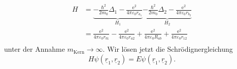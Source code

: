 \begin{equation}
	\label{3.23}
	\begin{split}
		H &= \underbrace{- \frac{\hbar ^2}{2 m_0} \Delta_1 - \frac{\mathrm{e}^2}{4 \pi \varepsilon_0 r_{a_1}}}_{H_1}  \underbrace{- \frac{\hbar ^2}{2 m_0} \Delta_2 - \frac{\mathrm{e}^2}{4 \pi \varepsilon_0 r_{b_2}}}_{H_2}\\
	  &= \frac{\mathrm{e}^2}{4 \pi \varepsilon_0 r_{b1}} - \frac{\mathrm{e}^2}{4 \pi \varepsilon_0 r_{a 2}} + \frac{\mathrm{e}^2}{4 \pi \varepsilon_0 R_{ab}}+ \frac{\mathrm{e}^2}{4 \pi \varepsilon_0 r_{12}} \\
	\end{split}
\end{equation}
unter der Annahme $m_{\text{Kern}} \to  \infty$. Wir lösen jetzt die Schrödignergleichung
\begin{equation}
	\label{3.24}
	H \psi\left( \underline{r}_{1}, \underline{r}_{2} \right) = E \psi \left( \underline{r}_{1}, \underline{r}_{2} \right).
\end{equation} 

